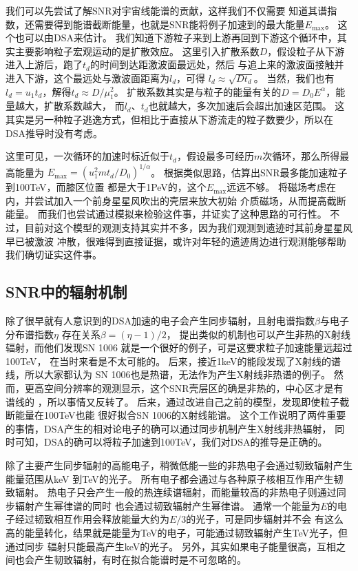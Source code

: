 我们可以先尝试了解SNR对宇宙线能谱的贡献\citep{Ptuskin2010}，这样我们不仅需要
知道其谱指数，还需要得到能谱截断能量，也就是SNR能将例子加速到的最大能量$E_{\max}$。
这个也可以由DSA来估计。
我们知道下游粒子来到上游再回到下游这个循环中，其实主要影响粒子宏观运动的是扩散效应。
这里引入扩散系数$D$，假设粒子从下游进入上游后，跑了$t_d$的时间到达距激波面最远处，然后
与追上来的激波面接触并进入下游，这个最远处与激波面距离为$l_d$，可得
$l_{d} \approx \sqrt{D t_{d}}$。
当然，我们也有$l_{d}=u_{1} t_{d}$，解得$t_d \approx D/\mu_1^2$。
扩散系数其实是与粒子的能量有关的$D=D_{0} E^{\alpha}$，能量越大，扩散系数越大，
而$l_{d}$、$t_{d}$也就越大，多次加速后会超出加速区范围。
这其实是另一种粒子逃逸方式\citep{Li2012}，但相比于直接从下游流走的粒子数要少，所以在
DSA推导时没有考虑。

这里可见，一次循环的加速时标近似于$t_{d}$，假设最多可经历$m$次循环，那么所得最高能量为
$E_{\max }=(u_{1}^{2} m t_{d}/D_{0})^{1/\alpha}$。
根据类似思路，\citet{1983A&A...125..249L}估算出SNR最多能加速粒子到100TeV，而膝区位置
都是大于1PeV的，这个$E_{\max}$远远不够。
\citet{Zirakashvili2018}将磁场考虑在内，并尝试加入一个前身星星风吹出的壳层来放大初始
介质磁场，从而提高截断能量。
而我们也尝试通过模拟来检验这件事，并证实了这种思路的可行性\citep{Zhang2018}。
不过，目前对这个模型的观测支持其实并不多，因为我们观测到遗迹时其前身星星风早已被激波
冲散，很难得到直接证据，或许对年轻的遗迹周边进行观测能够帮助我们确切证实这件事。

\subsection{SNR中的辐射机制}

除了很早就有人意识到的DSA加速的电子会产生同步辐射，且射电谱指数$\beta$与电子分布谱指数$\eta$
存在关系$\beta=(\eta-1)/2$，
\citet{Reynolds1981}提出类似的机制也可以产生非热的X射线辐射，而他们发现SN 1006
就是一个很好的例子\citep{Becker1980}，可是这要求粒子加速能量远超过100TeV，
在当时来看是不太可能的。
后来，\citet{1982ApL....22..103G}接近1keV的能段发现了X射线的谱线，所以大家都认为
SN 1006也是热谱，无法作为产生X射线非热谱的例子。
然而，更高空间分辨率的观测显示，这个SNR壳层区的确是非热的，中心区才是有谱线的
\citep{Koyama1995}，所以事情又反转了。
后来，\citep{Reynolds1998}通过改进自己之前的模型，发现即使粒子截断能量在100TeV也能
很好拟合SN 1006的X射线能谱。
这个工作说明了两件重要的事情，DSA产生的相对论电子的确可以通过同步机制产生X射线非热辐射，
同时可知，DSA的确可以将粒子加速到100TeV，我们对DSA的推导是正确的。

除了主要产生同步辐射的高能电子，稍微低能一些的非热电子会通过韧致辐射产生能量范围从keV
到TeV的光子。
所有电子都会通过与各种原子核相互作用产生韧致辐射。
热电子只会产生一般的热连续谱辐射，而能量较高的非热电子则通过同步辐射产生幂律谱的同时
也会通过韧致辐射产生幂律谱。
通常一个能量为$E$的电子经过韧致相互作用会释放能量大约为$E/3$的光子，可是同步辐射并不会
有这么高的能量转化，结果就是能量为TeV的电子，可能通过韧致辐射产生TeV光子，但通过同步
辐射只能最高产生keV的光子。
另外，其实如果电子能量很高，互相之间也会产生韧致辐射，有时在拟合能谱时是不可忽略的。


